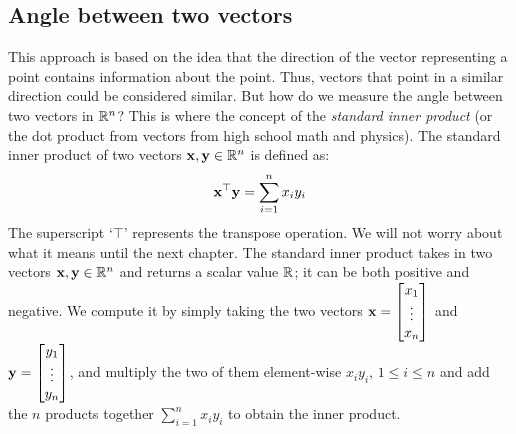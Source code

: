 \subsection{Angle between two vectors}
This approach is based on the idea that the direction of the vector representing a point contains information about the point. Thus, vectors that point in a similar direction could be considered similar. But how do we measure the angle between two vectors in $\mathbb{R}^n$? This is where the concept of the \textit{standard inner product} (or the dot product from vectors from high school math and physics). The standard inner product of two vectors $\mathbf{x}, \mathbf{y} \in \mathbb{R}^n$ is defined as:
\[ \mathbf{x}^\top\mathbf{y} = \sum_{i=1}^{n} x_i y_i \]
The superscript `$\top$' represents the transpose operation. We will not worry about what it means until the next chapter. The standard inner product takes in two vectors $\mathbf{x}, \mathbf{y} \in \mathbb{R}^n$ and returns a scalar value $\mathbb{R}$; it can be both positive and negative. We compute it by simply taking the two vectors $\mf{x} = \bmxc x_1 \\ \vdots \\ x_n \emx$ and $\mf{y} = \bmxc y_1 \\ \vdots \\ y_n \emx$, and multiply the two of them element-wise $x_i y_i, \, 1 \leq i \leq n$ and add the $n$ products together $\sum_{i=1}^n x_i y_i$ to obtain the inner product.

